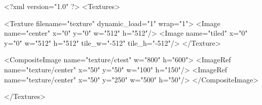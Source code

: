 <?xml version="1.0" ?>
<Textures>

	<Texture filename="texture" dynamic_load="1" wrap="1">
		<Image name="center" x="0" y="0" w="512" h="512"/>
		<Image name="tiled" x="0" y="0" w="512" h="512" tile_w="-512" tile_h="-512"/>
	</Texture>
	
	<CompositeImage name="texture/ctest" w="800" h="600">
		<ImageRef name="texture/center" x="50" y="50" w="100" h="150"/>
		<ImageRef name="texture/center" x="50" y="250" w="500" h="50"/>
	</CompositeImage>

</Textures>
